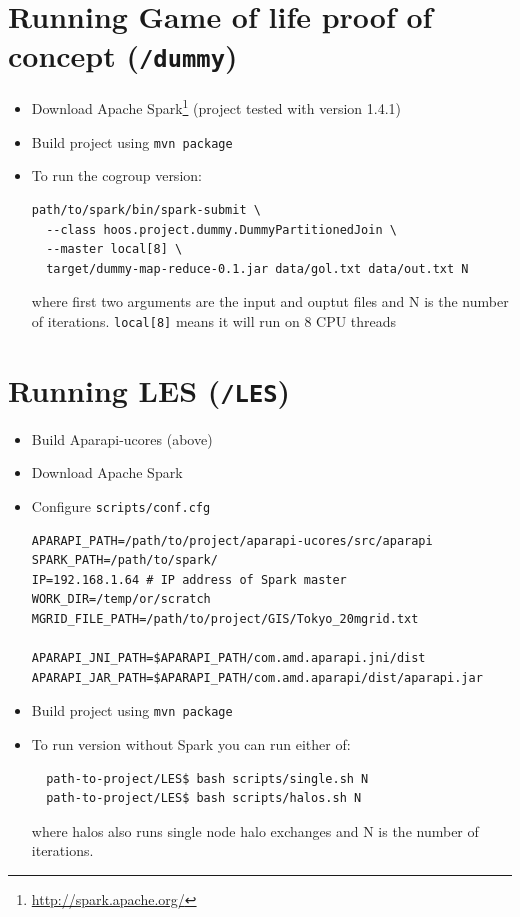 \documentclass{l4proj}
\begin{document}
\begin{appendices}
\section{Running Game of life proof of concept (\texttt{/dummy})}

\begin{itemize}
\item Download Apache Spark\footnote{\url{http://spark.apache.org/}} (project tested with version 1.4.1)
\item Build project using \texttt{mvn package}
\item To run the cogroup version:
\begin{verbatim}
path/to/spark/bin/spark-submit \
  --class hoos.project.dummy.DummyPartitionedJoin \
  --master local[8] \
  target/dummy-map-reduce-0.1.jar data/gol.txt data/out.txt N
\end{verbatim}
where first two arguments are the input and ouptut files and N is the number of iterations.
\texttt{local[8]} means it will run on 8 CPU threads
\end{itemize}

\section{Running LES (\texttt{/LES})}

\begin{itemize}
\item Build Aparapi-ucores (above)
\item Download Apache Spark
\item Configure \texttt{scripts/conf.cfg}
\begin{verbatim}
APARAPI_PATH=/path/to/project/aparapi-ucores/src/aparapi
SPARK_PATH=/path/to/spark/
IP=192.168.1.64 # IP address of Spark master
WORK_DIR=/temp/or/scratch
MGRID_FILE_PATH=/path/to/project/GIS/Tokyo_20mgrid.txt

APARAPI_JNI_PATH=$APARAPI_PATH/com.amd.aparapi.jni/dist
APARAPI_JAR_PATH=$APARAPI_PATH/com.amd.aparapi/dist/aparapi.jar
\end{verbatim}

\item Build project using \texttt{mvn package}

\item To run version without Spark you can run either of:
\begin{verbatim}
  path-to-project/LES$ bash scripts/single.sh N
  path-to-project/LES$ bash scripts/halos.sh N
\end{verbatim}
where halos also runs single node halo exchanges and N is the number of iterations.


\end{itemize}
\end{appendices}
\end{document}
